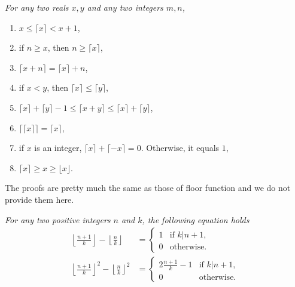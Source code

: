 \documentclass[12pt]{subfile}
\begin{document}
        \begin{proposition}\slshape \label{prop:ceiling}
        	For any two reals $x, y$ and any two integers $m,n$,
        	\begin{enumerate}[1.]
        		\item $x\leq \lceil x\rceil < x+1$,
        		\item if $n \geq x$, then $n \geq \lceil x \rceil$,
        		\item $\lceil x+n\rceil=\lceil x\rceil+n$,
        		\item if $x <y$, then $\lceil x \rceil \leq \lceil y \rceil$,
        		\item $\lceil x\rceil+\lceil y \rceil - 1 \leq \lceil x+y\rceil \leq \lceil x\rceil+\lceil y\rceil$,
        		\item $\lceil \lceil x\rceil\rceil  =  \lceil x\rceil$,
        		\item if $x$ is an integer, $\lceil x\rceil+\lceil -x\rceil=0$. Otherwise, it equals $1$,
        		\item $\lceil x \rceil \geq x \geq \lfloor x \rfloor$.
        	\end{enumerate}
        \end{proposition}
        
    The proofs are pretty much the same as those of floor function and we do not provide them here.

        \begin{problem}\slshape\label{thm:floor-k|n+1}
        	For any two positive integers $n$ and $k$, the following equation holds
        	\begin{align*}
        	\left\lfloor \frac{n+1}{k} \right\rfloor - \left\lfloor \frac{n}{k} \right\rfloor &=
        	\begin{cases}
        	1&\mbox{if }k|n+1,\\
        	0&\mbox{otherwise.}
        	\end{cases}\\
        	\left\lfloor \frac{n+1}{k} \right\rfloor^2 - \left\lfloor \frac{n}{k} \right\rfloor^2 &=
        	\begin{cases}
        	2\frac{n+1}{k}-1&\mbox{if }k|n+1,\\
        	0&\mbox{otherwise.}
        	\end{cases}
        	\end{align*}
        \end{problem}
    
\end{document}
